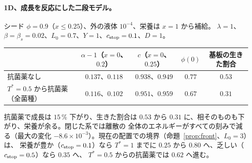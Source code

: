 \documentclass[11pt,a4paper]{article}
\theoremstyle{definition}
\begin{document}
\paragraph{1D、成長を反応にした二段モデル。} シード $\phi=0.9$（$x\le0.25$）、外の液体 $10^{-4}$、栄養は $x=1$ から補給。
$\lambda=1$、$\beta=\beta_s=0.02$、$L_0=0.7$、$Y=1$、$c_{\rm stop}=0.1$、$D=1$。
\begin{center}\small
\begin{tabular}{@{}lcccc@{}}
\toprule
& $\alpha-1$（$x=0$、$0.2$） & $c$（$x=0$、$0.25$） & $\phi(0)$ & 基板の生きた割合\\
\midrule
抗菌薬なし & $0.137$、$0.118$ & $0.938$、$0.949$ & $0.77$ & $0.53$\\
$T^*=0.5$ から抗菌薬（全菌種） & $0.116$、$0.102$ & $0.951$、$0.959$ & $0.67$ & $0.31$\\
\bottomrule
\end{tabular}
\end{center}
抗菌薬で成長は $15\,\%$ 下がり、生きた割合は $0.53$ から $0.31$ に、相そのものも下がり、栄養が余る。閉じた系では離散の
全体のエネルギーがすべての刻みで減る（最大の変化 $-8.6\times10^{-3}$）。現在の配置での境界（命題~\ref{prop:front}、$L_0=3$）は、
栄養が豊か（$c_{\rm stop}=0.1$）なら $T^*=1$ までに $0.25$ から $0.80$ へ、乏しい（$c_{\rm stop}=0.5$）なら $0.35$ へ、
$T^*=0.5$ からの抗菌薬では $0.62$ へ進む。
\end{document}
